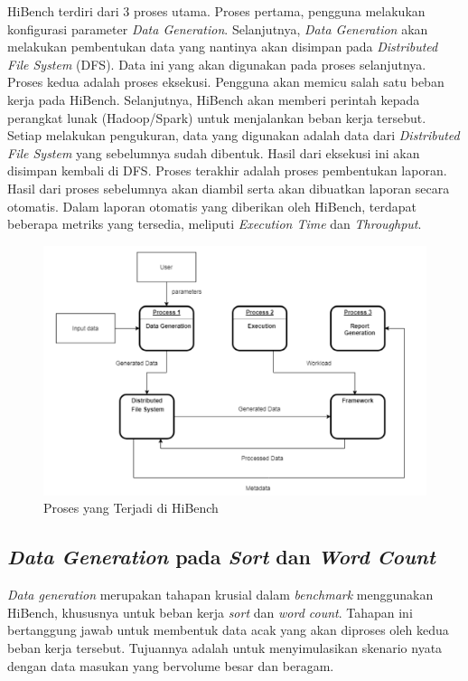 HiBench terdiri dari 3 proses utama. Proses pertama, pengguna melakukan konfigurasi parameter \textit{Data Generation}. Selanjutnya, \textit{Data Generation} akan melakukan pembentukan data yang nantinya akan disimpan pada \textit{Distributed File System} (DFS). Data ini yang akan digunakan pada proses selanjutnya. Proses kedua adalah proses eksekusi. Pengguna akan memicu salah satu beban kerja pada HiBench. Selanjutnya, HiBench akan memberi perintah kepada perangkat lunak (Hadoop/Spark) untuk menjalankan beban kerja tersebut. Setiap melakukan pengukuran, data yang digunakan adalah data dari \textit{Distributed File System} yang sebelumnya sudah dibentuk. Hasil dari eksekusi ini akan disimpan kembali di DFS. Proses terakhir adalah proses pembentukan laporan. Hasil dari proses sebelumnya akan diambil serta akan dibuatkan laporan secara otomatis. Dalam laporan otomatis yang diberikan oleh HiBench, terdapat beberapa metriks yang tersedia, meliputi \textit{Execution Time} dan \textit{Throughput}. 

\begin{figure}[h]
    \centering
    \includegraphics[width=1\textwidth]{figures/ch02/hibench-flow}
    \caption{Proses yang Terjadi di HiBench \cite{barosenAnalysisComparisonInterfacing2018}}
    \label{fig:hibench-process-flow}
\end{figure}

\subsection{\textit{Data Generation} pada \textit{Sort} dan \textit{Word Count}}
\textit{Data generation} merupakan tahapan krusial dalam \textit{benchmark} menggunakan HiBench, khususnya untuk beban kerja \textit{sort} dan \textit{word count}. Tahapan ini bertanggung jawab untuk membentuk data acak yang akan diproses oleh kedua beban kerja tersebut. Tujuannya adalah untuk menyimulasikan skenario nyata dengan data masukan yang bervolume besar dan beragam.


